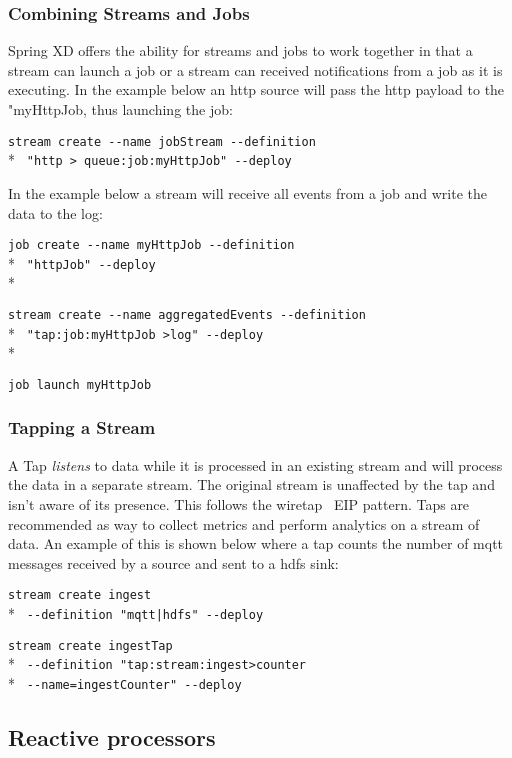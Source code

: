 \subsubsection {Combining Streams and Jobs}

Spring XD offers the ability for streams and jobs to work together in that
a stream can launch a job or a stream can received notifications from a job
as it is executing.  In the example below an http source will pass the http
payload to the "myHttpJob, thus launching the job:

\verb;stream create --name jobStream --definition ;\\*
\verb; "http > queue:job:myHttpJob" --deploy;

In the example below a stream will receive all events from a job and write
the data to the log:

\verb;job create --name myHttpJob --definition;\\*
\verb; "httpJob" --deploy;\\*

\verb;stream create --name aggregatedEvents --definition;\\*
\verb; "tap:job:myHttpJob >log" --deploy;\\*

\verb;job launch myHttpJob;

\subsubsection {Tapping a Stream} \label{sssec:deploytap}

A Tap \emph{listens} to data while it is processed in an existing
stream and will process the data in a separate stream. The original stream is 
unaffected by the tap and isn't aware of its presence.  This follows the 
wiretap~\cite{wiretap} EIP pattern.  Taps are recommended as way to collect 
metrics and perform analytics on a stream of data. An example of this is shown
below where a tap counts the number of mqtt messages received by a source 
and sent to a hdfs sink:

\verb;stream create ingest;\\* 
\verb; --definition "mqtt|hdfs" --deploy;

\verb;stream create ingestTap;\\*
\verb; --definition "tap:stream:ingest>counter;\\*
\verb; --name=ingestCounter" --deploy;

\subsection {Reactive processors}

